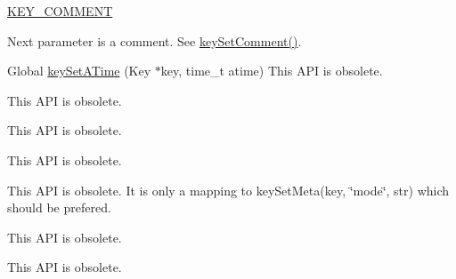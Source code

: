 \begin{DoxyRefList}
\begin{DoxyItemize}
\item \hyperlink{group__key_gga91fb3178848bd682000958089abbaf40ac29427bb47cc31689d02912e36161ee3}{K\-E\-Y\-\_\-\-C\-O\-M\-M\-E\-N\-T} \par
 Next parameter is a comment. See \hyperlink{group__keyvalue_ga8863a877a84fa46e6017fe72e49b89c1}{key\-Set\-Comment()}. 
\begin{DoxyCodeInclude}
\end{DoxyCodeInclude}
Global \hyperlink{group__keymeta_ga995d8b84731673c88c7c01f3fed538b9}{key\-Set\-A\-Time} (Key $\ast$key, time\-\_\-t atime) This A\-P\-I is obsolete. 
\end{DoxyItemize}
\item[\label{deprecated__deprecated000015}%
\hypertarget{deprecated__deprecated000015}{}%
Global \hyperlink{group__keymeta_ga9f502ecab8ab43f0b17220fcc95f3fa5}{key\-Set\-C\-Time} (Key $\ast$key, time\-\_\-t ctime)]This A\-P\-I is obsolete. 
\item[\label{deprecated__deprecated000007}%
\hypertarget{deprecated__deprecated000007}{}%
Global \hyperlink{group__keymeta_gaae575bd86a628a15ee45baa860522e75}{key\-Set\-Dir} (Key $\ast$key)]This A\-P\-I is obsolete. 
\item[\label{deprecated__deprecated000006}%
\hypertarget{deprecated__deprecated000006}{}%
Global \hyperlink{group__keymeta_ga9e3d0fb3f7ba906e067727b9155d22e3}{key\-Set\-G\-I\-D} (Key $\ast$key, gid\-\_\-t gid)]This A\-P\-I is obsolete. 
\item[\label{deprecated__deprecated000009}%
\hypertarget{deprecated__deprecated000009}{}%
Global \hyperlink{group__keymeta_ga8803037e35b9da1ce492323a88ff6bc3}{key\-Set\-Mode} (Key $\ast$key, mode\-\_\-t mode)]This A\-P\-I is obsolete. It is only a mapping to key\-Set\-Meta(key, \char`\"{}mode\char`\"{}, str) which should be prefered. 
\item[\label{deprecated__deprecated000013}%
\hypertarget{deprecated__deprecated000013}{}%
Global \hyperlink{group__keymeta_ga481d8997187992fe4bbf288bc8ef4db7}{key\-Set\-M\-Time} (Key $\ast$key, time\-\_\-t mtime)]This A\-P\-I is obsolete. 
\item[\label{deprecated__deprecated000004}%
\hypertarget{deprecated__deprecated000004}{}%
Global \hyperlink{group__keymeta_gab5f284f5ecd261e0a290095f50ba1af7}{key\-Set\-U\-I\-D} (Key $\ast$key, uid\-\_\-t uid)]This A\-P\-I is obsolete.
\end{DoxyRefList}